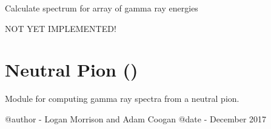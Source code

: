 \documentclass[letterpaper,10pt,english]{sphinxmanual}
\begin{document}
\begin{fulllineitems}
Calculate spectrum for array of gamma ray energies

\begin{sphinxVerbatim}[commandchars=\\\{\}]
   
   
     
  
   
\end{sphinxVerbatim}

\end{fulllineitems}


\begin{fulllineitems}
\label{\detokenize{modules:hazma.charged_pion.fsr}}
NOT YET IMPLEMENTED!

\end{fulllineitems}



\section{Neutral Pion ()}
\label{\detokenize{modules:module-hazma.neutral_pion}}\label{\detokenize{modules:neutral-pion-hazma-neutral-pion}}
Module for computing gamma ray spectra from a neutral pion.

@author - Logan Morrison and Adam Coogan
@date - December 2017
\end{document}
